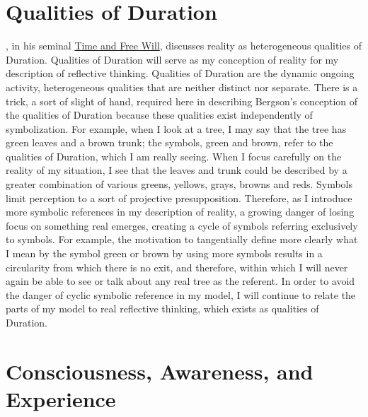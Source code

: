 \section{Qualities of Duration}

\cite{bergson:1910}, in his seminal \underline{Time and Free Will},
discusses reality as heterogeneous qualities of Duration.  Qualities
of Duration will serve as my conception of reality for my description
of reflective thinking.  Qualities of Duration are the dynamic ongoing
activity, heterogeneous qualities that are neither distinct nor
separate.  There is a trick, a sort of slight of hand, required here
in describing Bergson's conception of the qualities of Duration
because these qualities exist independently of symbolization.  For
example, when I look at a tree, I may say that the tree has green
leaves and a brown trunk; the symbols, green and brown, refer to the
qualities of Duration, which I am really seeing.  When I focus
carefully on the reality of my situation, I see that the leaves and
trunk could be described by a greater combination of various greens,
yellows, grays, browns and reds.  Symbols limit perception to a sort
of projective presupposition.  Therefore, as I introduce more symbolic
references in my description of reality, a growing danger of losing
focus on something real emerges, creating a cycle of symbols referring
exclusively to symbols.  For example, the motivation to tangentially
define more clearly what I mean by the symbol green or brown by using
more symbols results in a circularity from which there is no exit, and
therefore, within which I will never again be able to see or talk
about any real tree as the referent.  In order to avoid the danger of
cyclic symbolic reference in my model, I will continue to relate the
parts of my model to real reflective thinking, which exists as
qualities of Duration.

\section{Consciousness, Awareness, and Experience}

